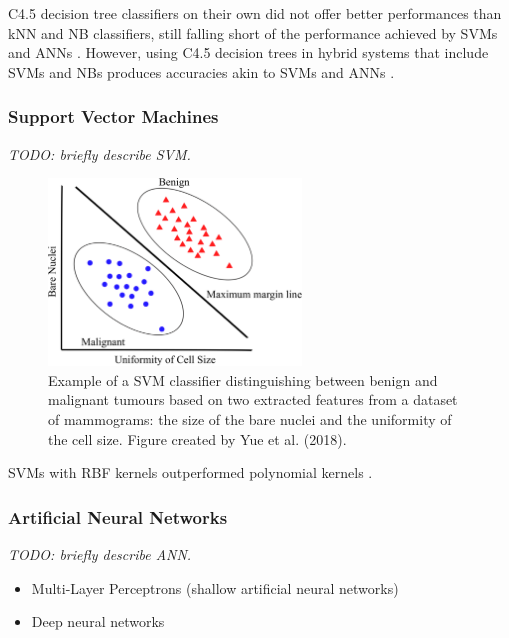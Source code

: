 C4.5 decision tree classifiers on their own did not offer better performances than kNN and NB classifiers, still falling short of the performance achieved by SVMs and ANNs \cite{Yue2018} \cite{Asri2016}. However, using C4.5 decision trees in hybrid systems that include SVMs and NBs produces accuracies akin to SVMs and ANNs \cite{Yue2018}.

\subsubsection{Support Vector Machines}

\textit{TODO: briefly describe SVM.}\\

\begin{figure}[ht]
\centerline{\includegraphics[width=0.6\textwidth]{Dissertation/figures/litsurvey/svm.png}}
\caption{\label{fig:litsurvey-svm-example}Example of a SVM classifier distinguishing between benign and malignant tumours based on two extracted features from a dataset of mammograms: the size of the bare nuclei and the uniformity of the cell size. Figure created by Yue et al. (2018).}
\end{figure}

SVMs with RBF kernels outperformed polynomial kernels \cite{Osareh2010}.

\subsubsection{Artificial Neural Networks}

\textit{TODO: briefly describe ANN.}\\

\begin{itemize}
    \item Multi-Layer Perceptrons (shallow artificial neural networks)
    \item Deep neural networks
\end{itemize}


